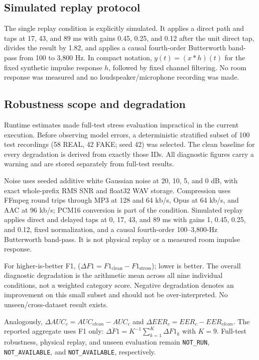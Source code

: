 \documentclass[10pt,journal,onecolumn]{IEEEtran}
\begin{document}
\subsection{Simulated replay protocol}
The single replay condition is explicitly simulated. It applies a direct path and taps at 17, 43, and 89 ms with gains 0.45, 0.25, and 0.12 after the unit direct tap, divides the result by 1.82, and applies a causal fourth-order Butterworth band-pass from 100 to 3,800 Hz. In compact notation, $y(t)=(x*h)(t)$ for the fixed synthetic impulse response $h$, followed by fixed channel filtering. No room response was measured and no loudspeaker/microphone recording was made.

\subsection{Robustness scope and degradation}
Runtime estimates made full-test stress evaluation impractical in the current execution. Before observing model errors, a deterministic stratified subset of 100 test recordings (58 REAL, 42 FAKE; seed 42) was selected. The clean baseline for every degradation is derived from exactly those IDs. All diagnostic figures carry a warning and are stored separately from full-test results.

Noise uses seeded additive white Gaussian noise at 20, 10, 5, and 0 dB, with exact whole-prefix RMS SNR and float32 WAV storage. Compression uses FFmpeg round trips through MP3 at 128 and 64 kb/s, Opus at 64 kb/s, and AAC at 96 kb/s; PCM16 conversion is part of the condition. Simulated replay applies direct and delayed taps at 0, 17, 43, and 89 ms with gains 1, 0.45, 0.25, and 0.12, fixed normalization, and a causal fourth-order 100--3,800-Hz Butterworth band-pass. It is not physical replay or a measured room impulse response.

For higher-is-better F1, ($\Delta F1=F1_{\text{clean}}-F1_{\text{stress}}$); lower is better. The overall diagnostic degradation is the arithmetic mean across all nine individual conditions, not a weighted category score. Negative degradation denotes an improvement on this small subset and should not be over-interpreted. No unseen/cross-dataset result exists.

Analogously, $\Delta AUC_c=AUC_{clean}-AUC_c$ and $\Delta EER_c=EER_c-EER_{clean}$. The reported aggregate uses F1 only: $\overline{\Delta F1}=K^{-1}\sum_{k=1}^{K}\Delta F1_k$ with $K=9$. Full-test robustness, physical replay, and unseen evaluation remain \texttt{NOT\_RUN}, \texttt{NOT\_AVAILABLE}, and \texttt{NOT\_AVAILABLE}, respectively.
\end{document}
